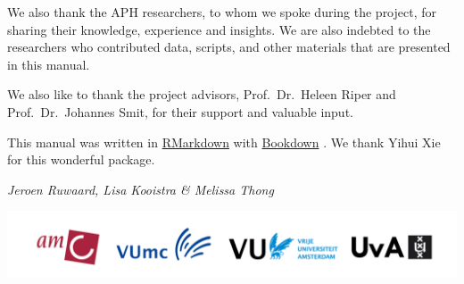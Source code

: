 \documentclass[]{book}
\begin{document}
We also thank the APH researchers, to whom we spoke during the project,
for sharing their knowledge, experience and insights. We are also
indebted to the researchers who contributed data, scripts, and other
materials that are presented in this manual.

We also like to thank the project advisors, Prof.~Dr.~Heleen Riper and
Prof.~Dr.~Johannes Smit, for their support and valuable input.

This manual was written in
\href{https://rmarkdown.rstudio.com/}{RMarkdown} with
\href{http://bookdown.org}{Bookdown} \citep{R-bookdown_book}. We thank
Yihui Xie for this wonderful package.

\emph{Jeroen Ruwaard, Lisa Kooistra \& Melissa Thong}

\begin{center}\includegraphics[width=0.98\linewidth]{images/aph_consortium} \end{center}



\printindex
\end{document}
